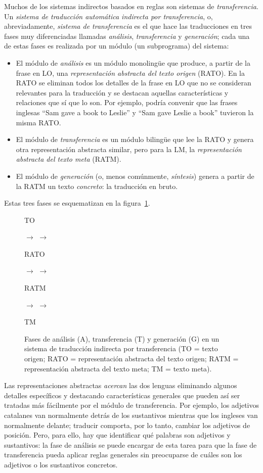 Muchos de los sistemas indirectos basados en reglas son sistemas de \emph{transferencia}. Un \emph{sistema de traducción automática indirecta por transferencia}, o, abreviadamente, \emph{sistema de transferencia} es el que hace las traducciones en tres fases muy diferenciadas llamadas \emph{análisis}, \emph{transferencia} y \emph{generación}; cada una de estas fases es realizada por un módulo (un subprograma) del sistema: \begin{itemize} \item El módulo de \emph{análisis} es un módulo monolingüe que produce, a partir de la frase en LO, una \emph{representación abstracta del texto origen} (RATO). En la RATO se eliminan todos los detalles de la frase en LO que no se consideran relevantes para la traducción y se destacan aquellas características y relaciones que sí que lo son. Por ejemplo, podría convenir que las frases inglesas ``Sam gave a book to Leslie'' y ``Sam gave Leslie a book'' \citep{arnold93j} tuvieron la misma RATO. \item El módulo de \emph{transferencia} es un módulo bilingüe que lee la RATO y genera otra representación abstracta similar, pero para la LM, la \emph{representación abstracta del texto meta} (RATM). \item El módulo de \emph{generación} (o, menos comúnmente, \emph{síntesis}) genera a partir de la RATM un texto \emph{concreto}: la traducción en bruto. \end{itemize} Estas tres fases se esquematizan en la figura~\ref{fg:transfer}. 

\begin{figure} \begin{center} \parbox{0.5cm}{TO} $\to$  $\to$ \parbox{1.0cm}{RATO} $\to$  $\to$ \parbox{1.25cm}{RATM} $\to$  $\to$ \parbox{0.5cm}{TM} \end{center} \caption{Fases de análisis (A), transferencia (T) y generación (G) en un sistema de traducción indirecta por transferencia (TO = texto origen; RATO = representación abstracta del texto origen; RATM = representación abstracta del texto meta; TM = texto meta).} \label{fg:transfer} \end{figure} 

Las representaciones abstractas \emph{acercan} las dos lenguas eliminando algunos detalles específicos y destacando características generales que pueden así ser tratadas más fácilmente por el módulo de transferencia. Por ejemplo, los adjetivos catalanes van normalmente detrás de los sustantivos mientras que los ingleses van normalmente delante; traducir comporta, por lo tanto, cambiar los adjetivos de posición. Pero, para ello, hay que identificar qué palabras son adjetivos y sustantivos: la fase de análisis se puede encargar de esta tarea para que la fase de transferencia pueda aplicar reglas generales sin preocuparse de cuáles son los adjetivos o los sustantivos concretos. 

